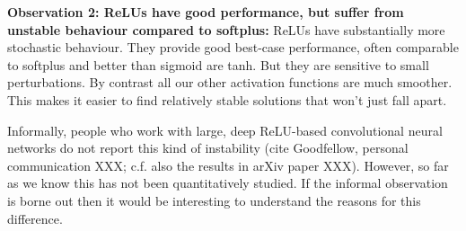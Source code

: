 \documentclass[10pt]{article}
\begin{document}
\textbf{Observation 2: ReLUs have good performance, but suffer from
  unstable behaviour compared to softplus:} ReLUs have substantially
more stochastic behaviour.  They provide good best-case performance,
often comparable to softplus and better than sigmoid are tanh.  But
they are sensitive to small perturbations.  By contrast all our other
activation functions are much smoother.  This makes it easier to find
relatively stable solutions that won't just fall apart.

Informally, people who work with large, deep ReLU-based convolutional
neural networks do not report this kind of instability (cite
Goodfellow, personal communication XXX; c.f. also the results in arXiv
paper XXX).  However, so far as we know this has not been
quantitatively studied.  If the informal observation is borne out then
it would be interesting to understand the reasons for this difference.
\end{document}
